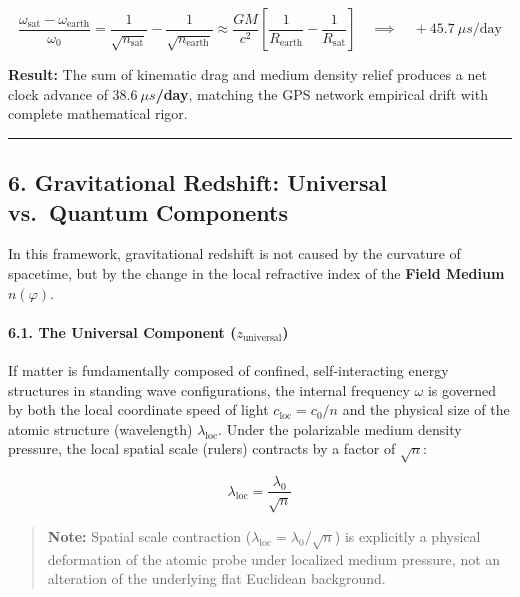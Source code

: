 \documentclass[twocolumn]{article}
\begin{document}
\[ \frac{\omega_{\text{sat}} - \omega_{\text{earth}}}{\omega_0} = \frac{1}{\sqrt{n_{\text{sat}}}} - \frac{1}{\sqrt{n_{\text{earth}}}} \approx \frac{GM}{c^2} \left[ \frac{1}{R_{\text{earth}}} - \frac{1}{R_{\text{sat}}} \right] \quad \implies \quad +45.7 \ \mu s\text{/day} \]

\textbf{Result:} The sum of kinematic drag and medium density relief
produces a net clock advance of \textbf{\(38.6 \ \mu s\)/day}, matching
the GPS network empirical drift with complete mathematical rigor.

\begin{center}\rule{0.5\linewidth}{0.5pt}\end{center}

\subsection{6. Gravitational Redshift: Universal vs.~Quantum
Components}\label{gravitational-redshift-universal-vs.-quantum-components}

In this framework, gravitational redshift is not caused by the curvature
of spacetime, but by the change in the local refractive index of the
\textbf{Field Medium} \(n(\varphi)\).

\paragraph{\texorpdfstring{6.1. The Universal Component
(\(z_{\text{universal}}\))}{6.1. The Universal Component (z\_\{\textbackslash text\{universal\}\})}}\label{the-universal-component-z_textuniversal}

If matter is fundamentally composed of confined, self-interacting energy
structures in standing wave configurations, the internal frequency
\(\omega\) is governed by both the local coordinate speed of light
\(c_{\text{loc}} = c_0/n\) and the physical size of the atomic structure
(wavelength) \(\lambda_{\text{loc}}\). Under the polarizable medium
density pressure, the local spatial scale (rulers) contracts by a factor
of \(\sqrt{n}\):

\[ \lambda_{\text{loc}} = \frac{\lambda_0}{\sqrt{n}} \]

\begin{quote}
\textbf{Note:} Spatial scale contraction
(\(\lambda_{\text{loc}} = \lambda_0/\sqrt{n}\)) is explicitly a physical
deformation of the atomic probe under localized medium pressure, not an
alteration of the underlying flat Euclidean background.
\end{quote}
\end{document}
